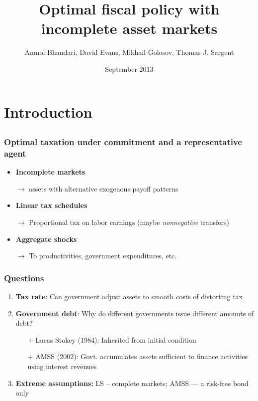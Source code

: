 \documentclass{beamer}
\title {Optimal fiscal policy with incomplete asset markets}
\author{Anmol Bhandari, David Evans, Mikhail Golosov, Thomas J. Sargent}
\date{September 2013}
\begin{document}
%
\begin{frame}
\titlepage

\end{frame}
\section{Introduction}
\subsection{}
\begin{frame}
\frametitle{Optimal taxation under commitment and a representative agent}

\begin{itemize}

 \item \textbf{Incomplete markets}

 \quad \color{red}$\rightarrow$ \color{black} assets with alternative exogenous payoff patterns

 \item \textbf{Linear tax schedules}

 \quad \color{red}$\rightarrow$ \color{black}Proportional tax on labor earnings (maybe  {\em nonnegative} transfers)

 \item \textbf{Aggregate shocks}

 \quad \color{red}$\rightarrow$ \color{black} To productivities, government expenditures,  etc.

 \end{itemize}
\end{frame}



\begin{frame}
\frametitle{Questions}

\begin{enumerate}
\item \textbf{Tax rate}: Can government adjust assets to smooth  costs of distorting tax
\item \textbf{Government debt}: Why do different governments issue different amounts of debt?
\begin{itemize}
 \item [+] Lucas Stokey (1984): Inherited from initial condition
 \item [+ ] AMSS (2002): Govt. accumulates assets sufficient to finance activities using interest revenues
\end{itemize}
\item \textbf{Extreme assumptions:}  LS -- complete markets; AMSS --- a risk-free bond only
\end{enumerate}
\end{frame}
\end{document}
